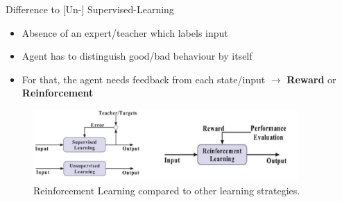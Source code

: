 \begin{frame}[c]{Difference to [Un-] Supervised-Learning}
\begin{itemize}
	\item Absence of an expert/teacher which labels input
	\item Agent has to distinguish good/bad behaviour by itself
	\item For that, the agent needs feedback from each state/input $\rightarrow$ \textbf{Reward} or \textbf{Reinforcement}
\end{itemize}
\begin{figure}[ht]
	\centering
	\includegraphics[width=0.9\textwidth]{img-elias/learningMethods.png}
	\caption{Reinforcement Learning compared to other learning strategies.}
\end{figure}
\end{frame}

